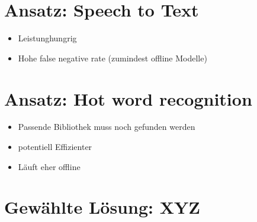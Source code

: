 \section{Ansatz: Speech to Text}

\begin{itemize}
    \item Leistunghungrig
    \item Hohe false negative rate (zumindest offline Modelle)
\end{itemize}

\section{Ansatz: Hot word recognition}

\begin{itemize}
    \item Passende Bibliothek muss noch gefunden werden
    \item potentiell Effizienter
    \item Läuft eher offline
\end{itemize}

\section{Gewählte Lösung: XYZ}